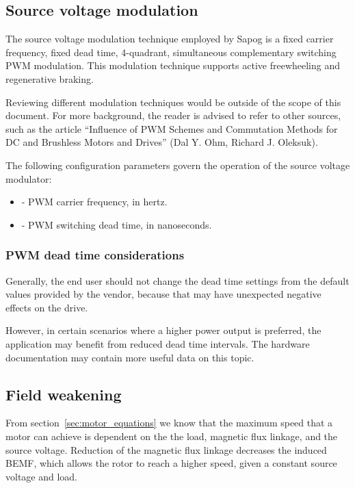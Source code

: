 \documentclass{zubaxdoc}
\begin{document}
	\subsection{Source voltage modulation}
	
	The source voltage modulation technique employed by Sapog is a fixed carrier frequency, fixed dead time,
	4-quadrant, simultaneous complementary switching PWM modulation.
	This modulation technique supports active freewheeling and regenerative braking.
	
	Reviewing different modulation techniques would be outside of the scope of this document.
	For more background, the reader is advised to refer to other sources, such as the article
	``Influence of PWM Schemes and Commutation Methods for DC and Brushless Motors and Drives''
	(Dal Y. Ohm, Richard J. Oleksuk).
	
	The following configuration parameters govern the operation of the source voltage modulator:
	\begin{itemize}
		\item {} - PWM carrier frequency, in hertz.
		\item {} - PWM switching dead time, in nanoseconds.
	\end{itemize}
	
	\subsubsection{PWM dead time considerations}
	
	Generally, the end user should not change the dead time settings from the default values provided by
	the vendor, because that may have unexpected negative effects on the drive.
	
	However, in certain scenarios where a higher power output is preferred, the application may benefit from
	reduced dead time intervals.
	The hardware documentation may contain more useful data on this topic.
	
	\subsection{Field weakening}\label{sec:field_weakening}
	
	From section~\ref{sec:motor_equations} we know that the maximum speed that a motor can achieve is dependent
	on the the load, magnetic flux linkage, and the source voltage.
	Reduction of the magnetic flux linkage decreases the induced BEMF, which allows the rotor to reach a higher speed,
	given a constant source voltage and load.
	
\end{document}

